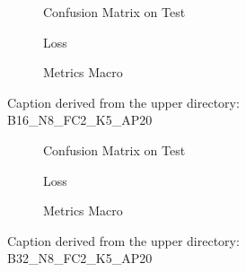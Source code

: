 \begin{figure}
    \centering
    \begin{subfigure}{0.3\linewidth}
        \centering
        
        \caption{Confusion Matrix on Test}
        \label{fig:confMatrixTest-6}
    \end{subfigure}
    \begin{subfigure}{0.3\linewidth}
        \centering
        
        \caption{Loss}
        \label{fig:loss-6}
    \end{subfigure}
    \begin{subfigure}{0.3\linewidth}
        \centering
        
        \caption{Metrics Macro}
        \label{fig:metricsMacro-6}
    \end{subfigure}

    \caption{Caption derived from the upper directory: B16\_N8\_FC2\_K5\_AP20}
    \label{fig:overallCaption-6}
\end{figure}


\begin{figure}
    \centering
    \begin{subfigure}{0.3\linewidth}
        \centering
        
        \caption{Confusion Matrix on Test}
        \label{fig:confMatrixTest-7}
    \end{subfigure}
    \begin{subfigure}{0.3\linewidth}
        \centering
        
        \caption{Loss}
        \label{fig:loss-7}
    \end{subfigure}
    \begin{subfigure}{0.3\linewidth}
        \centering
        
        \caption{Metrics Macro}
        \label{fig:metricsMacro-7}
    \end{subfigure}

    \caption{Caption derived from the upper directory: B32\_N8\_FC2\_K5\_AP20}
    \label{fig:overallCaption-7}
\end{figure}


